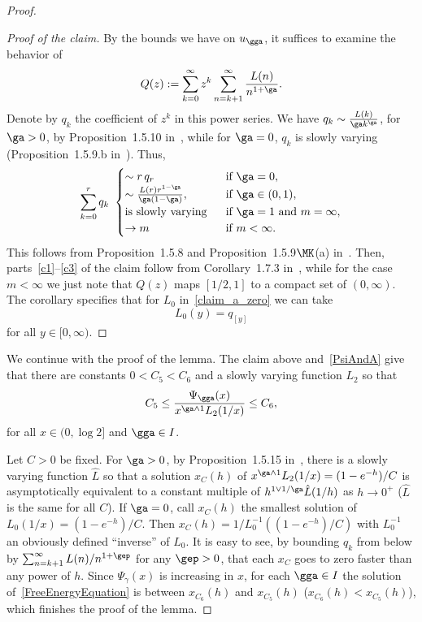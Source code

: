 \begin{proof}
\begin{proof}[Proof of the claim]
By the bounds we have on $u_\gga$, it suffices to examine the behavior of
\begin{equation}
Q(z) := \sum_{k=0}^\infty z^k \sum_{n=k+1}^\infty \frac{L(n)}{n^{1 + \ga}}.
\end{equation}
Denote by $q_k$ the coefficient of $z^k$ in this power series. We have $q_k \sim \frac{L(k)}{\ga k^\ga}$, for $\ga > 0$, by Proposition~1.5.10 in~\cite{BGT89}, while for $\ga = 0$, $q_k$ is slowly varying (Proposition~1.5.9.b in~\cite{BGT89}). Thus,
\begin{equation}
\sum_{k=0}^r q_k \, \,
\begin{cases}
\sim r \, q_r & \text{ if } \ga = 0,\\
\sim \frac{L(r) r^{1 - \ga}}{\ga (1 - \ga)}, & \text{ if } \ga \in (0,1),\\
\text{is slowly varying } & \text{ if $\ga=1$ and } m = \infty,\\
\to m & \text{ if } m < \infty.
\end{cases}
\end{equation}
This follows from Proposition~1.5.8 and Proposition~1.5.9$\MK$(a) in~\cite{BGT89}. Then, parts~\eqref{c1}--\eqref{c3} of the claim follow from Corollary~1.7.3 in~\cite{BGT89}, while for the case $m < \infty$ we just note that $Q(z)$ maps $[1/2,1]$ to a compact set of $(0,\infty)$. The corollary specifies that for $L_0$ in~\eqref{claim_a_zero} we can take
\begin{equation}\label{L0sv}
L_0(y) = q_{[y]}
\end{equation}
for all $y \in [0,\infty)$.
\end{proof}

We continue with the proof of the lemma. The claim above and~\eqref{PsiAndA} give that there are constants $0 < C_5 < C_6$ and a slowly varying function $L_2$ so that
\begin{equation}
C_5 \leq \frac{\Psi_\gga(x)}{x^{\ga \wedge 1} L_2(1/x)} \leq C_6,
\end{equation}
for all $x \in (0, \log 2]$ and $\gga \in I$.

Let $C > 0$ be fixed. For $\ga > 0$, by Proposition~1.5.15 in~\cite{BGT89}, there is a slowly varying function $\hat L$ so that a solution $x_C(h)$ of $x^{\ga \wedge 1} L_2(1/x) = (1 - e^{- h})/C$ is asymptotically equivalent to a constant multiple of $h^{1 \vee 1/\ga} \hat L(1/h)$ as $h \to 0^+$ ($\hat L$ is the same for all $C$). If $\ga = 0$, call $x_C(h)$ the smallest solution of $L_0(1/x) = (1 - e^{- h})/C$. Then $x_C(h) = 1/L_0^{-1}((1 - e^{- h})/C)$ with $L_0^{-1}$ an obviously defined ``inverse'' of $L_0$. It is easy to see, by bounding $q_k$ from below by $\sum_{n=k+1}^\infty L(n)/n^{1 + \gep}$ for any $\gep > 0$, that each $x_C$ goes to zero faster than any power of $h$. Since $\Psi_\gamma(x)$ is increasing in $x$, for each $\gga \in I$ the solution of~\eqref{FreeEnergyEquation} is between $x_{C_6}(h)$ and $x_{C_5}(h)$ ($x_{C_6}(h) < x_{C_5}(h)$), which finishes the proof of the lemma.
\end{proof}

